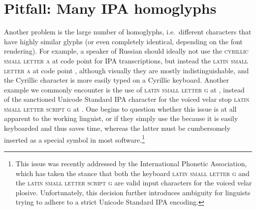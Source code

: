 \section{Pitfall: Many IPA homoglyphs}
\label{pitfall-there-are-many-ipa-homoglyphs-in-unicode}

Another problem is the large number of homoglyphs, i.e.~different characters
that have highly similar glyphs (or even completely identical, depending on the
font rendering). For example, a speaker of Russian should ideally not use the
\textsc{cyrillic small letter a} at code point  for IPA
transcriptions, but instead the \textsc{latin small letter a} at code point
, although visually they are mostly indistinguishable, and the
Cyrillic character is more easily typed on a Cyrillic keyboard. Another example
we commonly encounter is the use of \textsc{latin small letter g} at ,
instead of the sanctioned Unicode Standard IPA character for the voiced velar
stop \textsc{latin small letter script g} at . One begins to question
whether this issue is at all apparent to the working linguist, or if they simply
use the  because it is easily keyboarded and thus saves time, whereas
the latter must be cumbersomely inserted as a special symbol in most
software.\footnote{This issue was recently addressed by the International
Phonetic Association, which has taken the stance that both the keyboard
\textsc{latin small letter g} and the \textsc{latin small letter script g} are
valid input characters for the voiced velar plosive. Unfortunately, this
decision further introduces ambiguity for linguists trying to adhere to a strict
Unicode Standard IPA encoding.}


